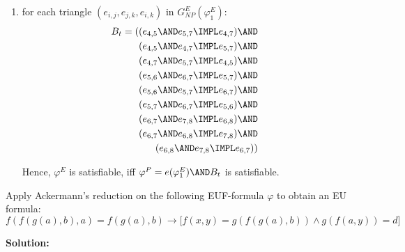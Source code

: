 \documentclass[11pt,a4paper]{uebung}
\newcommand{\solution}[1]{\par {\bf Solution:}\\#1}
\begin{document}
{\begin{enumerate}
\begin{enumerate}
\item for each triangle $(e_{i,j},e_{j,k},e_{i,k})$ in $G_{NP}^{E}(\varphi
_{1}^{E})$:%
\begin{eqnarray*}
B_{t}=((e_{4,5}\AND e_{5,7}\IMPL e_{4,7})\AND && \\
(e_{4,5}\AND e_{4,7}\IMPL e_{5,7})\AND && \\
(e_{4,7}\AND e_{5,7}\IMPL e_{4,5})\AND && \\
(e_{5,6}\AND e_{6,7}\IMPL e_{5,7})\AND && \\
(e_{5,6}\AND e_{5,7}\IMPL e_{6,7})\AND && \\
(e_{5,7}\AND e_{6,7}\IMPL e_{5,6})\AND && \\
(e_{6,7}\AND e_{7,8}\IMPL e_{6,8})\AND && \\
(e_{6,7}\AND e_{6,8}\IMPL e_{7,8})\AND && \\
(e_{6,8}\AND e_{7,8}\IMPL e_{6,7})) &&
\end{eqnarray*}

Hence, $\varphi ^{E}$ is satisfiable, iff $\varphi ^{P}=e(\varphi _{1}^{E})%
\AND B_{t}$ is satisfiable.
\end{enumerate}
\end{enumerate}


  }



\newpage
{}
Apply Ackermann's reduction on the following EUF-formula $\varphi$ to obtain
an EU formula:
\begin{displaymath}
  f\left(f\left(g\left(a\right),b\right),a\right) = f(g(a),b) \rightarrow \big[ f(x,y) = g(f(g(a),b)) \land
  g(f(a,y))=d \big]
\end{displaymath}


\solution{
}
\end{document}
